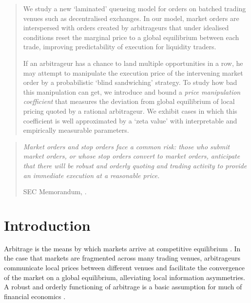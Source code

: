 \maketitle

\begin{abstract}

  We study a new `laminated' queueing model for orders on batched trading venues such as decentralised exchanges.
  In our model, market orders are interspersed with orders created by arbitrageurs that under idealised conditions reset the marginal price to a global equilibrium between each trade, improving predictability of execution for liquidity traders.
  
  If an arbitrageur has a chance to land multiple opportunities in a row, he may attempt to manipulate the execution price of the intervening market order by a probabilistic `blind sandwiching' strategy.
  To study how bad this manipulation can get, we introduce and bound a \emph{price manipulation coefficient} that measures the deviation from global equilibrium of local pricing quoted by a rational arbitrageur.
  We exhibit cases in which this coefficient is well approximated by a `zeta value' with interpretable and empirically measurable parameters.

\end{abstract}

\vspace{3ex}

\begin{quote}

  \emph{Market orders and stop orders face a common risk: those who submit market orders, or whose stop orders convert to market orders, anticipate that there will be robust and orderly quoting and trading activity to provide an immediate execution at a reasonable price.}
  
  \hfill SEC Memorandum, \cite{sec2016certain}.

\end{quote}

\setcounter{tocdepth}{1}
\tableofcontents

\section{Introduction}\label{introduction}


Arbitrage is the means by which markets arrive at competitive equilibrium \cite{nau1991arbitrage}.
%
In the case that markets are fragmented across many trading venues, arbitrageurs communicate local prices between different venues and facilitate the convergence of the market on a global equilibrium, alleviating local information asymmetries.
%
A robust and orderly functioning of arbitrage is a basic assumption for much of financial economics \cite{modigliani1958cost,werner1987arbitrage,varian1987arbitrage}.

